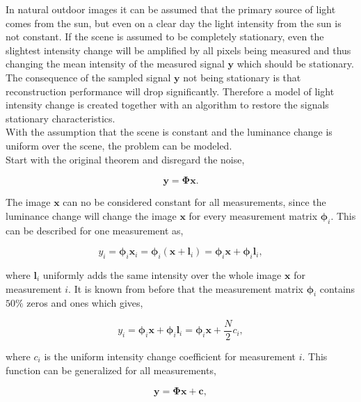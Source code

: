 In natural outdoor images it can be assumed that the primary source of light comes from the sun, but even on a clear day the light intensity from the sun is not constant. If the scene is assumed to be completely stationary, even the slightest intensity change will be amplified by all pixels being measured and thus changing the mean intensity of the measured signal $\mathbf{y}$ which should be stationary. The consequence of the sampled signal $\mathbf{y}$ not being stationary is that reconstruction performance will drop significantly. Therefore a model of light intensity change is created together with an algorithm to restore the signals stationary characteristics.\\[0.1in] 


With the assumption that the scene is constant and the luminance change is uniform over the scene, the problem can be modeled.\\[0.1in]

Start with the original theorem and disregard the noise, 

\begin{equation}
\mathbf{y} = \mathbf{\Phi}\mathbf{x}.
\end{equation}  

The image $\mathbf{x}$ can no be considered constant for all measurements, since the luminance change will change the image $\mathbf{x}$ for every measurement matrix $\mathbf{\phi}_i$. This can be described for one measurement as,  

\begin{equation}
y_i = \mathbf{\phi}_i\mathbf{x}_i = \mathbf{\phi}_i(\mathbf{x} + \mathbf{l}_i) = \mathbf{\phi}_i\mathbf{x} + \mathbf{\phi}_i\mathbf{l}_i ,
\end{equation}
  
where $\mathbf{l}_i$ uniformly adds the same intensity over the whole image $\mathbf{x}$ for measurement $i$. It is known from before that the measurement matrix $\mathbf{\phi}_i$ contains $50\%$ zeros and ones which gives,

\begin{equation}
y_i = \mathbf{\phi}_i\mathbf{x} + \mathbf{\phi}_i\mathbf{l}_i = \mathbf{\phi}_i\mathbf{x} + \frac{N}{2}c_i,
\end{equation}

where $c_i$ is the uniform intensity change coefficient for measurement $i$. This function can be generalized for all measurements,

\begin{equation}
\mathbf{y} =  \mathbf{\Phi}\mathbf{x} + \mathbf{c},
\end{equation}

